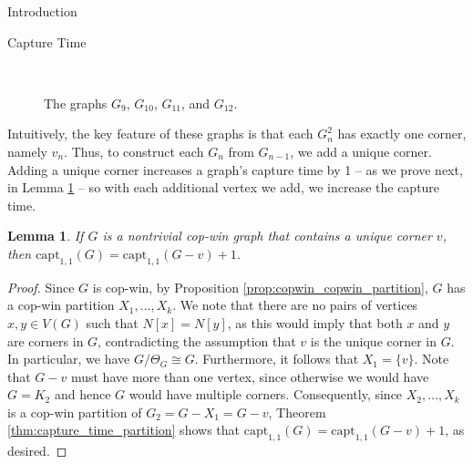 \documentclass[12pt]{amsart}
\newcommand{\comment}[1]{\textcolor{red}{#1}}
\newtheorem{lemma}{Lemma}[section]
\theoremstyle{definition}
\newcommand{\capt}[1]{\mathrm{capt}_{#1,#1}}
\begin{document}
\begin{section}{Introduction}
\begin{section}{Capture Time}
\begin{figure}[ht]
\hfill\,\\\bigskip
\caption{The graphs $G_9$, $G_{10}$, $G_{11}$, and $G_{12}$.}
\label{fig:capture_time_graphs}
\end{figure}

Intuitively, the key feature of these graphs is that each $G_n^2$ has exactly one corner, namely $v_n$.  Thus, to construct each $G_n$ from $G_{n-1}$, we add a unique corner.  Adding a unique corner increases a graph's capture time by 1 -- as we prove next, in Lemma \ref{lem:capture_time_unique_corner} -- so with each additional vertex we add, we increase the capture time. 




\begin{lemma}\label{lem:capture_time_unique_corner}
    If $G$ is a nontrivial cop-win graph that contains a unique corner $v$, then $\mathrm{capt}_{1,1}(G)=\mathrm{capt}_{1,1}(G-v)+1$.
\end{lemma}
\begin{proof}
    Since $G$ is cop-win, by Proposition \ref{prop:copwin_copwin_partition}, $G$ has a cop-win partition $X_1,\dots,X_k$.  We note that there are no pairs of vertices $x,y\in V(G)$ such that $N[x]=N[y]$, as this would imply that both $x$ and $y$ are corners in $G$, contradicting the assumption that $v$ is the unique corner in $G$.  In particular, we have $G / \Theta_{G}\cong G$.  Furthermore, it follows that $X_1=\{v\}$.  Note that $G-v$ must have more than one vertex, since otherwise we would have $G=K_2$ and hence $G$ would have multiple corners.  Consequently, since $X_2,\dots,X_k$ is a cop-win partition of $G_2=G-X_1=G-v$, Theorem \ref{thm:capture_time_partition} shows that $\mathrm{capt}_{1,1}(G)=\mathrm{capt}_{1,1}(G-v)+1$, as desired.
\end{proof}


\end{section}
\end{section}
\end{document}
